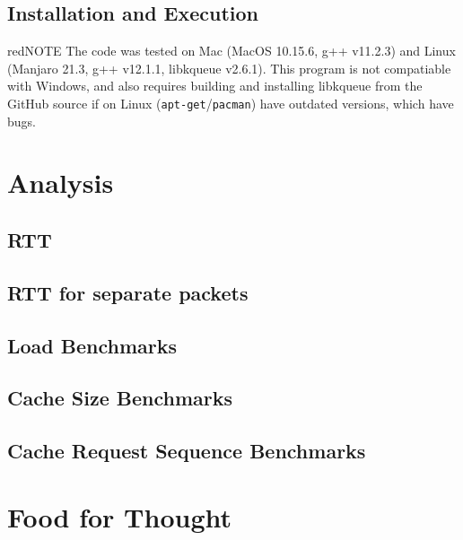 \documentclass[12pt]{article}
\begin{document}
\subsection{Installation and Execution}

\begin{mybox}{red}{NOTE}
The code was tested on Mac (MacOS 10.15.6, g++ v11.2.3) and Linux (Manjaro 21.3, g++ v12.1.1, libkqueue v2.6.1). This program is not compatiable with Windows, and also requires building and installing libkqueue from the GitHub source if on Linux (\texttt{apt-get}/\texttt{pacman}) have outdated versions, which have bugs.
\end{mybox}


\section{Analysis}
\subsection{RTT}
\subsection{RTT for separate packets}
\subsection{Load Benchmarks}
\subsection{Cache Size Benchmarks}
\subsection{Cache Request Sequence Benchmarks}

\section{Food for Thought}
\end{document}
